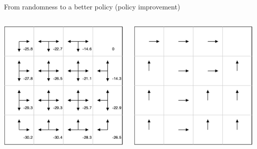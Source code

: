 \documentclass[9pt]{beamer}
\begin{document}
\begin{frame}{From randomness to a better policy (policy improvement)}
\begin{columns}

\begin{column}{0.5\textwidth}
	\begin{center}
		\includegraphics[width=\textwidth]{figures/gridworld1a.png}	
	\end{center}
\end{column}

\begin{column}{0.5\textwidth}
	\begin{center}
		\includegraphics[width=\textwidth]{figures/gridworld1b.png}	
	\end{center}
\end{column}


\end{columns}
\end{frame}
\end{document}
